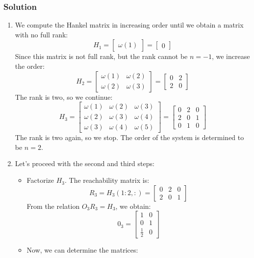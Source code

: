 \subsubsection*{Solution}
\begin{enumerate}
    \item We compute the Hankel matrix in increasing order until we obtain a matrix with no full rank:
        \[H_1=\begin{bmatrix} \omega(1) \end{bmatrix}=\begin{bmatrix} 0 \end{bmatrix}\]
        Since this matrix is not full rank, but the rank cannot be $n=-1$, we increase the order:
        \[H_2=\begin{bmatrix} \omega(1) & \omega(2) \\ \omega(2) & \omega(3) \end{bmatrix}=\begin{bmatrix} 0 & 2 \\ 2 & 0 \end{bmatrix}\]
        The rank is two, so we continue:
        \[H_3=\begin{bmatrix} \omega(1) & \omega(2) & \omega(3) \\ \omega(2) & \omega(3) & \omega(4) \\ \omega(3) & \omega(4) & \omega(5) \end{bmatrix}=\begin{bmatrix} 0 & 2 & 0 \\ 2 & 0 & 1 \\ 0 & 1 & 0 \end{bmatrix}\]
        The rank is two again, so we stop.
        The order of the system is determined to be $n=2$.
    \item Let's proceed with the second and third steps:
        \begin{itemize}
            \item Factorize $H_3$. 
                The reachability matrix is:
                \[R_3=H_3(1:2,:)=\begin{bmatrix} 0 & 2 & 0 \\ 2 & 0 & 1 \end{bmatrix}\]
                From the relation $O_3R_3=H_3$, we obtain:
                \[0_3=\begin{bmatrix} 1 & 0 \\ 0 & 1 \\ \frac{1}{2} & 0 \end{bmatrix}\]
            \item Now, we can determine the matrices:

\end{itemize}
\end{enumerate}
